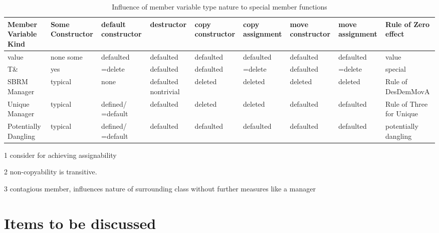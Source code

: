 \documentclass[ebook,11pt,article]{memoir}
\begin{document}

\begin{table}[htp]
\caption{Influence of member variable type nature to special member functions}

\label{tab:safesane}
\begin{center}
\begin{threeparttable}
\begin{tabular}{|p{1.8cm}|p{1.5cm}|p{1.5cm}|p{1.5cm}|p{1.5cm}|p{1.5cm}|p{1.5cm}|p{1.5cm}|p{2cm}|}
\hline
Member Variable Kind & Some Constructor & default constructor & destructor & copy constructor & copy assignment & move constructor & move assignment & Rule of Zero effect \\\hline\hline
value & none some & defaulted & defaulted & defaulted & defaulted & defaulted & defaulted & value \\\hline
T\& & yes & =delete & defaulted & defaulted & =delete & defaulted & =delete & special\tnote{1} \\\hline
SBRM Manager & typical & none & defaulted nontrivial & deleted & deleted & deleted & deleted & Rule of DesDemMovA \tnote{2} \tnote{3} \\\hline
Unique Manager & typical & defined/ =default & defaulted & deleted & deleted & defaulted & defaulted & Rule of Three for Unique\tnote{3} \\\hline
Potentially Dangling & typical & defined/ =default & defaulted & defaulted & defaulted & defaulted & defaulted & potentially dangling\tnote{3}\\\hline
\end{tabular}
\begin{tablenotes}
\item[1] consider  for achieving assignability
\item[2] non-copyability is transitive.
\item[3] contagious member, influences nature of surrounding class without further measures like a manager 
\end{tablenotes}
\end{threeparttable}

\end{center}
\end{table}


\section{Items to be discussed}
\end{document}
